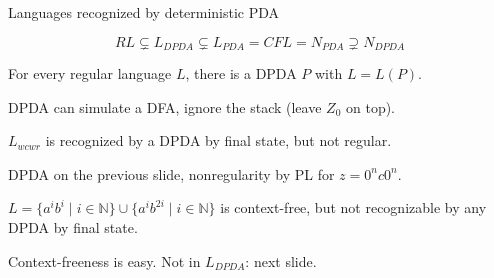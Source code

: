 \documentclass[handout]{beamer}
\begin{document}
\begin{frame}{Languages recognized by deterministic PDA}

    \vspace{-24pt}
    {\Large
    $$
    RL\subsetneq L_{DPDA} \subsetneq L_{PDA}=CFL = N_{PDA}\supsetneq N_{DPDA}
    $$
    }
    \vspace{-6pt}
      
    \begin{proposition}
        For every regular language $L$, there is a DPDA $P$ with $L=L(P)$.
    \end{proposition}

    \vspace{-6pt}
    DPDA can simulate a DFA, ignore the stack (leave $Z_0$ on top).
    \hfill\qedsymbol
 
    \medskip

    \begin{example}
       $L_{wcwr}$ is recognized by a DPDA by final state, but not regular.
    \end{example}

    \vspace{-6pt}
    DPDA on the previous slide, nonregularity by PL for $z=0^nc0^n$.
    \hfill\qedsymbol

    \medskip
    
    \begin{example}
        $L=\{a^ib^i\mid i \in \mathbb{N}\} \cup \{a^ib^{2i}\mid i \in \mathbb{N}\}$ is context-free, but not recognizable by any DPDA by final state.
    \end{example}

    \vspace{-6pt}
    Context-freeness is easy. Not in $L_{DPDA}$: next slide.

\end{frame}
\end{document}
